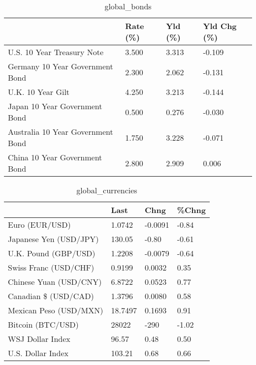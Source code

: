 \documentclass{article}%
\begin{document}
%


\begin{table}[htbp]%
\caption{global\_bonds}%
\centering%
\begin{adjustbox}{width=1\textwidth}%
\begin{tabular}{llll}
\toprule
                                  & Rate (\%) & Yld (\%) & Yld Chg (\%) \\
\midrule
       U.S. 10 Year Treasury Note &    3.500 &   3.313 &      -0.109 \\
  Germany 10 Year Government Bond &    2.300 &   2.062 &      -0.131 \\
                U.K. 10 Year Gilt &    4.250 &   3.213 &      -0.144 \\
    Japan 10 Year Government Bond &    0.500 &   0.276 &      -0.030 \\
Australia 10 Year Government Bond &    1.750 &   3.228 &      -0.071 \\
    China 10 Year Government Bond &    2.800 &   2.909 &       0.006 \\
\bottomrule
\end{tabular}
%
\end{adjustbox}%
\end{table}

%


\begin{table}[htbp]%
\caption{global\_currencies}%
\centering%
\begin{adjustbox}{width=1\textwidth}%
\begin{tabular}{llll}
\toprule
                       &    Last &    Chng & \%Chng \\
\midrule
        Euro (EUR/USD) &  1.0742 & -0.0091 & -0.84 \\
Japanese Yen (USD/JPY) &  130.05 &   -0.80 & -0.61 \\
  U.K. Pound (GBP/USD) &  1.2208 & -0.0079 & -0.64 \\
 Swiss Franc (USD/CHF) &  0.9199 &  0.0032 &  0.35 \\
Chinese Yuan (USD/CNY) &  6.8722 &  0.0523 &  0.77 \\
  Canadian \$ (USD/CAD) &  1.3796 &  0.0080 &  0.58 \\
Mexican Peso (USD/MXN) & 18.7497 &  0.1693 &  0.91 \\
     Bitcoin (BTC/USD) &   28022 &    -290 & -1.02 \\
      WSJ Dollar Index &   96.57 &    0.48 &  0.50 \\
     U.S. Dollar Index &  103.21 &    0.68 &  0.66 \\
\bottomrule
\end{tabular}
%
\end{adjustbox}%
\end{table}
\end{document}
